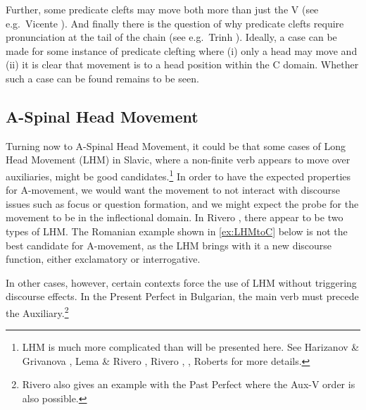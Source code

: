 \documentclass[output=paper,colorlinks,citecolor=brown,
]{langscibook}
\begin{document}

Further, some predicate clefts may move both more than just the V (see e.g.\ Vicente \citeyearpar{Vicente:2009}).  And finally there is the question of why predicate clefts require pronunciation at the tail of the chain (see e.g.\ Trinh \citeyear{Trinh:2009}).  Ideally, a case can be made for some instance of predicate clefting where (i) only a head may move and (ii) it is clear that movement is to a head position within the C domain.  Whether such a case can be found remains to be seen.

\subsection{A-Spinal Head Movement}

Turning now to A-Spinal Head Movement, it could be that some cases of Long Head Movement (LHM) in Slavic, where a non-finite verb appears to move over auxiliaries, might be good candidates.\footnote{LHM is much more complicated than will be presented here.  See Harizanov \& Grivanova \citeyearpar{Harizanov:2018}, Lema \& Rivero \citeyearpar{Lema:1989}, Rivero \citeyearpar{Rivero:1991a},  \citeyearpar{Rivero:1994}, Roberts \citeyearpar{Roberts:2010} for more details.}  In order to have  the expected properties for A-movement, we would want the movement to  not interact with discourse issues such as focus or question formation, and we might expect the probe for the movement to be in the inflectional domain.  In Rivero \citeyearpar{Rivero:1994}, there appear to be two types of LHM.  The Romanian example shown in \ref{ex:LHMtoC} below is not the best candidate for A-movement, as the LHM brings with it a new discourse function, either exclamatory or interrogative.

\ea\label{ex:LHMtoC}

In other cases, however, certain contexts force the use of LHM without triggering discourse effects.  In the Present Perfect in Bulgarian, the main verb must precede the Auxiliary.\footnote{Rivero \citeyear{Rivero:1994} also gives an example with the Past Perfect where the Aux-V order is also possible.}
\end{document}
